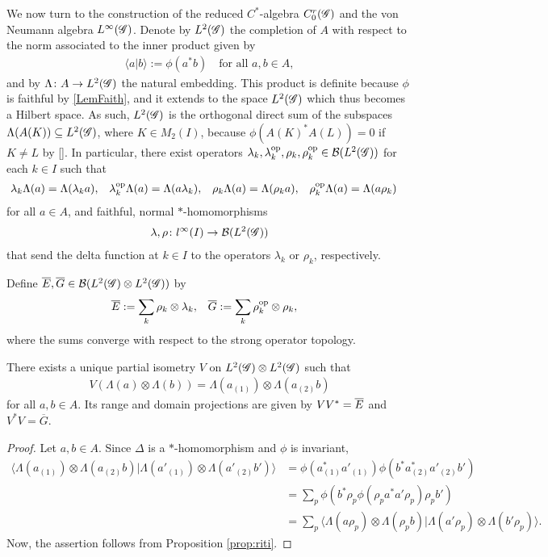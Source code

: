 We now turn to the construction of the reduced $C^{*}$-algebra $C^{r}_{0}(\mathscr{G})$
and the von Neumann algebra $L^{\infty}(\mathscr{G})$. 
Denote by $L^{2}(\mathscr{G})$ the completion of $A$ with respect to the norm
associated to the inner product given by
\begin{align*}
  \langle a|b\rangle :=\phi(a^{*}b) \quad \text{for all } a,b\in A,
\end{align*}
and by $\Lambda \colon A \to L^{2}(\mathscr{G})$ the natural embedding.  This
product is definite because $\phi$ is faithful by \ref{LemFaith}, and
it extends to the space $L^{2}(\mathscr{G})$ which thus becomes a Hilbert space.
As such, $L^{2}(\mathscr{G})$ is the
orthogonal direct sum of the subspaces
$\Lambda(A(K)) \subseteq L^{2}(\mathscr{G})$, where $K\in M_{2}(I)$, because
$\phi(A(K)^{*}A(L)) = 0$ if $K\neq L$ by \ref{}.  In particular, there
exist  operators
$\lambda_{k},\lambda_{k}^{\operatorname{\mathrm{op}}},\rho_{k},\rho_{k}^{\operatorname{\mathrm{op}}}\in {\cal
  B}(L^{2}(\mathscr{G}))$ for each $k\in I$ such that
\begin{align*}
  \lambda_{k}\Lambda(a)&= \Lambda(\lambda_{k} a), &
  \lambda^{\operatorname{\mathrm{op}}}_{k}\Lambda(a) &= \Lambda(a\lambda_{k}), &
  \rho_{k}\Lambda(a) &= \Lambda(\rho_{k}a), &
  \rho_{k}^{\operatorname{\mathrm{op}}}\Lambda(a) &= \Lambda(a\rho_{k})
\end{align*}
for all $a\in A$, and faithful, normal $*$-homomorphisms
\begin{align} \label{eq:vn-lambda-rho}
  \lambda,\rho \colon l^{\infty}(I) \to
  {\cal B}(L^{2}(\mathscr{G}))
\end{align}
that send the delta function at
$k\in I$ to the operators $\lambda_{k}$ or $\rho_{k}$, respectively. 

 Define $\overline{E},\overline{G} \in {\cal B}(L^{2}(\mathscr{G}) \otimes
L^{2}(\mathscr{G}))$ by
\begin{align*}
  \overline{E} &:=\sum_{k} \rho_{k} \otimes \lambda_{k}, & 
  \overline{G} &:= \sum_{k} \rho_{k}^{\operatorname{\mathrm{op}}} \otimes \rho_{k},
\end{align*}
where the sums converge with respect to the strong operator
topology.
\begin{Lem} \label{lemma:partial-isometry}
There exists a unique partial isometry $V$ on $L^{2}(\mathscr{G}) \otimes L^{2}(\mathscr{G})$
such that
\begin{align*}
  V(\Lambda(a) \otimes \Lambda(b)) = \Lambda(a_{(1)}) \otimes \Lambda(a_{(2)}b)
\end{align*}
for all $a,b\in A$. Its range and domain projections are given by $VV^{*} = \overline{E}$
and $V^{*}V = \overline{G}$.
\end{Lem}
\begin{proof}
  Let $a,b \in A$. Since $\Delta$ is a $*$-homomorphism and $\phi$ is
invariant,
  \begin{align*}
    \langle \Lambda(a_{(1)}) \otimes
    \Lambda(a_{(2)}b)|\Lambda(a'_{(1)}) \otimes
    \Lambda(a'_{(2)}b')\rangle &=
    \phi(a_{(1)}^{*}a'_{(1)})\phi(b^{*}a_{(2)}^{*}a'_{(2)}b') \\
    &= \sum_{p}
    \phi(b^{*}\rho_{p}\phi(\rho_{p}a^{*}a'\rho_{p})\rho_{p}b') \\
    & =\sum_{p} \langle\Lambda(a\rho_{p}) \otimes \Lambda(\rho_{p}b) |
    \Lambda(a'\rho_{p}) \otimes \Lambda(b'\rho_{p})\rangle.
  \end{align*}
  Now, the assertion follows from Proposition \ref{prop:riti}.
\end{proof}

